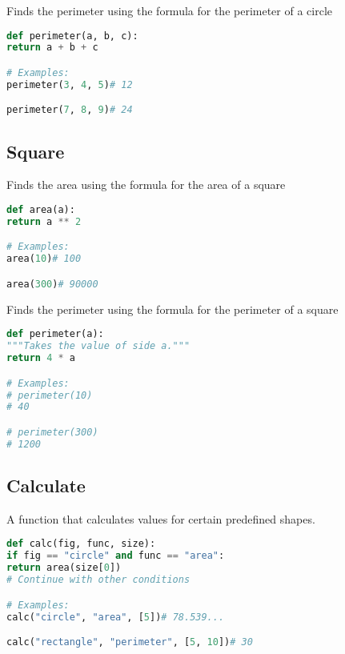 \documentclass{article}
\begin{document}
Finds the perimeter using the formula for the perimeter of ​​a circle
\begin{lstlisting}[language=Python, caption={Perimeter Function for Triangle}]
def perimeter(a, b, c):
return a + b + c

# Examples:
perimeter(3, 4, 5)# 12

perimeter(7, 8, 9)# 24
\end{lstlisting}

\subsection*{Square}

Finds the area using the formula for the area of ​​a square
\begin{lstlisting}[language=Python, caption={Area Function for Square}]
def area(a):
return a ** 2

# Examples:
area(10)# 100

area(300)# 90000
\end{lstlisting}

Finds the perimeter using the formula for the perimeter of ​​a square
\begin{lstlisting}[language=Python, caption={Perimeter Function for Square}]
def perimeter(a):
"""Takes the value of side a."""
return 4 * a

# Examples:
# perimeter(10)
# 40

# perimeter(300)
# 1200
\end{lstlisting}

\subsection*{Calculate}

A function that calculates values for certain predefined shapes.
\begin{lstlisting}[language=Python, caption={Calculate Function}]
def calc(fig, func, size):
if fig == "circle" and func == "area":
return area(size[0])
# Continue with other conditions

# Examples:
calc("circle", "area", [5])# 78.539...

calc("rectangle", "perimeter", [5, 10])# 30
\end{lstlisting}
\end{document}

